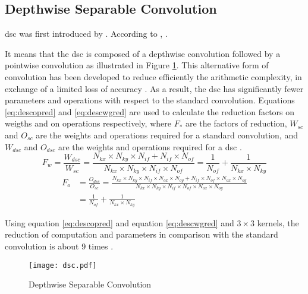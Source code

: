 \subsection{Depthwise Separable Convolution}  \label{subs:dsc}
\acrfull{dsc} was first introduced by \textcite{sifre_ecole_2014}. According to \textcite{chollet_xception_2017}, .

It means that the \acrshort{dsc} is composed of a depthwise convolution followed by a pointwise convolution as illustrated in Figure \ref{fig:dsc}. This alternative form of convolution has been developed to reduce efficiently the arithmetic complexity, in exchange of a limited loss of accuracy \cite{liu_fpga-based_2019}. As a result, the \acrshort{dsc} has significantly fewer parameters and operations with respect to the standard convolution. Equations \eqref{eq:descopred} and \eqref{eq:descwgred} are used to calculate the reduction factors on weigths and on operations respectively, where $F_{*}$ are the factors of reduction, $W_{sc}$ and $O_{sc}$ are the weights and operations required for a standard convolution, and $W_{dsc}$ and $O_{dsc}$ are the weights and operations required for a \acrshort{dsc} \cite{liu_fpga-based_2019}.
%
\begin{equation}
    F_w = \frac{W_{dsc}}{W_{sc}} =
    \frac{N_{kx} \times N_{ky} \times N_{if} + N_{if} \times N_{of}}{N_{kx} \times N_{ky} \times N_{if} \times N_{of}} =
    \frac{1}{N_{of}} + \frac{1}{N_{kx} \times N_{ky}}
    \label{eq:descopred}
\end{equation}
\begin{equation}
    \begin{split}
        F_o &= \frac{O_{dsc}}{O_{sc}} = \frac{N_{kx} \times N_{ky} \times N_{if} \times N_{ox} \times N_{oy} + N_{if} \times N_{of} \times N_{ox} \times N_{oy}}{N_{kx} \times N_{ky} \times N_{if} \times N_{of} \times N_{ox} \times N_{oy}} \\
        &= \frac{1}{N_{of}} + \frac{1}{N_{kx} \times N_{ky}}
    \end{split}
    \label{eq:descwgred}
\end{equation}

Using equation \eqref{eq:descopred} and equation \eqref{eq:descwgred} and $3 \times 3$ kernels, the reduction of computation and parameters in comparison with the standard convolution is about 9 times \cite{zhang_channel_2019}.
%
\begin{figure}
    \texttt{[image: dsc.pdf]}
    \caption{Depthwise Separable Convolution}
    \label{fig:dsc}
\end{figure}
